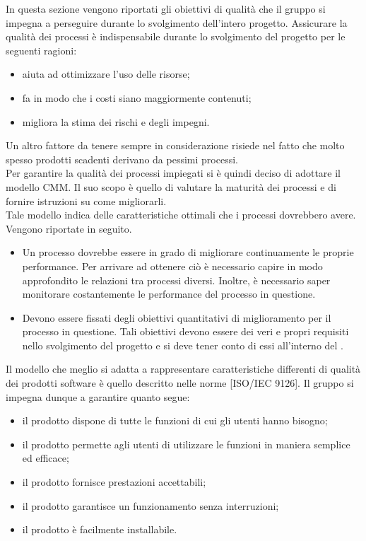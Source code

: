 
	In questa sezione vengono riportati gli obiettivi di qualità che il gruppo \groupname{} si impegna a perseguire durante lo svolgimento dell'intero 
	progetto.
		Assicurare la qualità dei processi è indispensabile durante lo svolgimento del progetto per le seguenti ragioni:
		\begin{itemize}
			\item aiuta ad ottimizzare l'uso delle risorse;
			\item fa in modo che i costi siano maggiormente contenuti;
			\item migliora la stima dei rischi e degli impegni.
		\end{itemize}
		Un altro fattore da tenere sempre in considerazione risiede nel fatto che molto spesso prodotti scadenti derivano da pessimi processi.\\
		Per garantire la qualità dei processi impiegati si è quindi deciso di adottare il modello CMM. Il suo scopo è quello di valutare la maturità dei processi e di fornire istruzioni su come migliorarli.\\
		Tale modello indica delle caratteristiche ottimali che i processi dovrebbero avere. Vengono riportate in seguito.
		\begin{itemize}
			\item Un processo dovrebbe essere in grado di migliorare continuamente le proprie performance. Per arrivare ad ottenere ciò è necessario capire in modo approfondito le relazioni tra processi diversi. Inoltre, è necessario saper monitorare costantemente le performance del processo in questione.
			\item Devono essere fissati degli obiettivi quantitativi di miglioramento per il processo in questione. Tali obiettivi devono essere dei veri e propri requisiti nello svolgimento del progetto e si deve tener conto di essi all'interno del .
		\end{itemize}
		Il modello che meglio si adatta a rappresentare caratteristiche differenti di qualità dei prodotti software è quello descritto nelle norme [ISO/IEC 9126]. Il gruppo \groupname{} si impegna dunque a garantire quanto segue:
		\begin{itemize}
			\item il prodotto dispone di tutte le funzioni di cui gli utenti hanno bisogno;
			\item il prodotto permette agli utenti di utilizzare le funzioni in maniera semplice ed efficace;
			\item il prodotto fornisce prestazioni accettabili;
			\item il prodotto garantisce un funzionamento senza interruzioni;
			\item il prodotto è facilmente installabile.
		\end{itemize}
